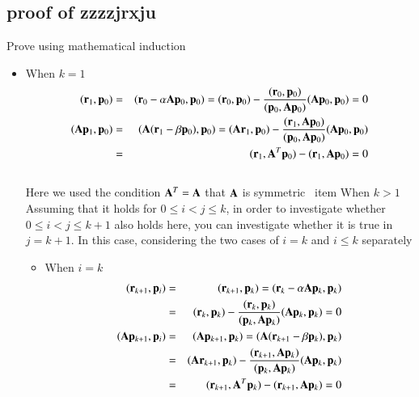 \subsection{proof of zzzzjrxju}


Prove using mathematical induction

\begin{itemize}

\item When $k=1$ \\
\begin{eqnarray}
(\mathbf{r}_1,\mathbf{p}_0)
&=&  (\mathbf{r}_0-\alpha\mathbf{A}\mathbf{p}_0,\mathbf{p}_0) = (\mathbf{r}_0,\mathbf{p}_0)-\frac{(\mathbf{r}_0,\mathbf{p}_0)}{(\mathbf{p}_0,\mathbf{A}\mathbf{p}_0)}(\mathbf{A}\mathbf{p}_0,\mathbf{p}_0)  =  0 \\
(\mathbf{A}\mathbf{p}_1,\mathbf{p}_0)
&=& (\mathbf{A}(\mathbf{r}_1-\beta\mathbf{p}_0),\mathbf{p}_0) = (\mathbf{A}\mathbf{r}_1,\mathbf{p}_0)-\frac{(\mathbf{r}_1,\mathbf{A}\mathbf{p}_0)}{(\mathbf{p}_0,\mathbf{A}\mathbf{p}_0)}(\mathbf{A}\mathbf{p}_0,\mathbf{p}_0) \\
&=& (\mathbf{r}_1,\mathbf{A}^T\mathbf{p}_0)-(\mathbf{r}_1,\mathbf{A}\mathbf{p}_0)=0
\end{eqnarray}\\
Here we used the condition $\mathbf{A}^T=\mathbf{A}$ that $\mathbf{A}$ is symmetric
\ item When $k>1$ \\
Assuming that it holds for $0\le{i}<{j}\le{k}$, in order to investigate whether $0\le{i}<{j}\le{k+1}$ also holds here, you can investigate whether it is true in $j=k+1$. In this case, considering the two cases of $i=k$ and $i\le{k}$ separately
\begin {itemize}
\item When $i=k$ \ \
\begin{eqnarray}
(\mathbf{r}_{k+1},\mathbf{p}_i)
&=&  (\mathbf{r}_{k+1},\mathbf{p}_k)  =  (\mathbf{r}_k-\alpha\mathbf{A}\mathbf{p}_k,\mathbf{p}_k) \\
&=& (\mathbf{r}_k,\mathbf{p}_k)-\frac{(\mathbf{r}_k,\mathbf{p}_k)}{(\mathbf{p}_k,\mathbf{A}\mathbf{p}_k)}(\mathbf{A}\mathbf{p}_k,\mathbf{p}_k)=0\\
(\mathbf{A}\mathbf{p}_{k+1},\mathbf{p}_i)
&=& (\mathbf{A}\mathbf{p}_{k+1},\mathbf{p}_k) = (\mathbf{A}(\mathbf{r}_{k+1}-\beta\mathbf{p}_k),\mathbf{p}_k) \\
&=& (\mathbf{A}\mathbf{r}_{k+1},\mathbf{p}_k)-\frac{(\mathbf{r}_{k+1},\mathbf{A}\mathbf{p}_k)}{(\mathbf{p}_k,\mathbf{A}\mathbf{p}_k)}(\mathbf{A}\mathbf{p}_k,\mathbf{p}_k) \\
&=& (\mathbf{r}_{k+1},\mathbf{A}^T\mathbf{p}_k)-(\mathbf{r}_{k+1},\mathbf{A}\mathbf{p}_k)=0
\end{eqnarray}


\end{itemize}
\end{itemize}
